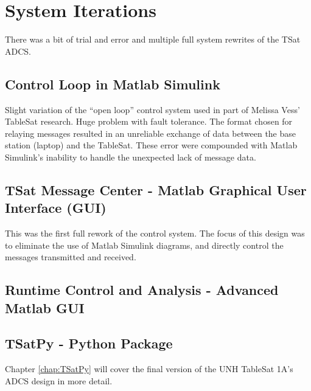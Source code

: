 

\chapter{System Iterations}
\label{chap:SystemIterations}

There was a bit of trial and error and multiple full system rewrites of the TSat ADCS.


\section{Control Loop in Matlab Simulink}
\label{sec:ControlLoopinSimulink}

Slight variation of the ``open loop'' control system used in part of Melissa Vess' TableSat research.  Huge problem with fault tolerance.  The format chosen for relaying messages resulted in an unreliable exchange of data between the base station (laptop) and the TableSat.  These error were compounded with Matlab Simulink's inability to handle the unexpected lack of message data.


\section{TSat Message Center - Matlab Graphical User Interface (GUI)}
\label{sec:TSatMessageCenter}

This was the first full rework of the control system.  The focus of this design was to eliminate the use of Matlab Simulink diagrams, and directly control the messages transmitted and received.


\section{Runtime Control and Analysis - Advanced Matlab GUI}
\label{sec:RuntimeControlandAnalysis}

\section{TSatPy - Python Package}
\label{sec:TSatPyPythonPackage}

Chapter \ref{chap:TSatPy} will cover the final version of the UNH TableSat 1A's ADCS design in more detail.

